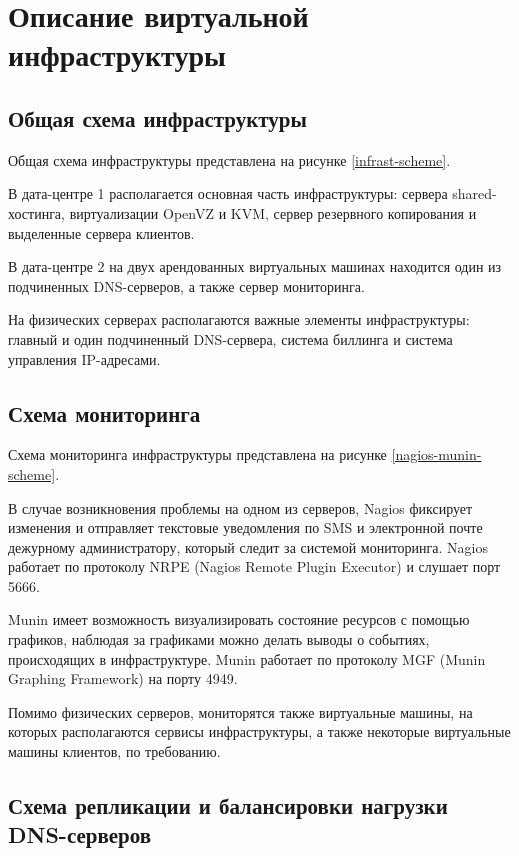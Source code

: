 \section{Описание виртуальной инфраструктуры}

\subsection{Общая схема инфраструктуры}

Общая схема инфраструктуры представлена на рисунке \ref{infrast-scheme}.

В дата-центре 1 располагается основная часть инфраструктуры: сервера shared-хостинга, виртуализации OpenVZ и KVM, сервер резервного копирования и выделенные сервера клиентов.

В дата-центре 2 на двух арендованных виртуальных машинах находится один из подчиненных DNS-серверов, а также сервер мониторинга.

На физических серверах располагаются важные элементы инфраструктуры: главный и один подчиненный DNS-сервера, система биллинга и система управления IP-адресами.

\subsection{Схема мониторинга}

Схема мониторинга инфраструктуры представлена на рисунке \ref{nagios-munin-scheme}.

В случае возникновения проблемы на одном из серверов, Nagios фиксирует изменения и отправляет текстовые уведомления по SMS и электронной почте дежурному администратору, который следит за системой мониторинга.
Nagios работает по протоколу NRPE (Nagios Remote Plugin Executor) и слушает порт 5666.

Munin имеет возможность визуализировать состояние ресурсов с помощью графиков, наблюдая за графиками можно делать выводы о событиях, происходящих в инфраструктуре.
Munin работает по протоколу MGF (Munin Graphing Framework) на порту 4949.

Помимо физических серверов, мониторятся также виртуальные машины, на которых располагаются сервисы инфраструктуры, а также некоторые виртуальные машины клиентов, по требованию.

\subsection{Схема репликации и балансировки нагрузки DNS-серверов}

